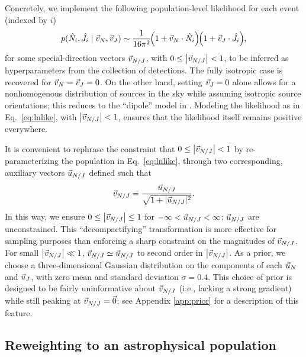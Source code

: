 \documentclass[aps,prd,twocolumn,superscriptaddress,preprintnumbers,floatfix,nofootinbib]{revtex4-2}
\begin{document}
Concretely, we implement the following population-level likelihood for each event (indexed by $i$)
\begin{equation}
\label{eq:lnlike}
p(\hat{N}_i,\hat{J}_i \mid \vec{v}_{N}, \vec{v}_{J}) \sim \frac{1}{16 \pi^2}  \hspace{-3pt}\left(1 + \vec{v}_{N} \cdot \hat{N}_i\right) \hspace{-3pt} \left(1 + \vec{v}_{J} \cdot \hat{J}_i\right) \hspace{-2pt} ,
\end{equation}
for some special-direction vectors $\vec{v}_{N/J}$, with $0 \leq \left| \vec{v}_{N/J} \right| < 1$, to be inferred as hyperparameters from the collection of detections.
The fully isotropic case is recovered for $\vec{v}_{N} = \vec{v}_{J} = 0$.
On the other hand, setting $\vec{v}_{J} = 0$ alone allows for a nonhomogenous distribution of sources in the sky while assuming isotropic source orientations; this reduces to the ``dipole'' model in \cite{Essick:2022slj}.
Modeling the likelihood as in Eq.~\eqref{eq:lnlike}, with $\left| \vec{v}_{N/J} \right| < 1$, ensures that the likelihood itself remains positive everywhere.

It is convenient to rephrase the constraint that $0 \leq \left| \vec{v}_{N/J} \right| <
1$ by re-parameterizing the population in Eq.~\eqref{eq:lnlike}, through two
corresponding, auxiliary vectors $\vec{u}_{N/J}$ defined such that
\begin{equation}
\vec{v}_{N/J} = \frac{\vec{u}_{N/J} }{\sqrt{1 + |\vec{u}_{N/J}|^2}} .
\end{equation}
In this way, we ensure $0 \leq \left| \vec{v}_{N/J} \right| \leq 1$ for $-\infty <
\vec{u}_{N/J} < \infty$; $\vec{u}_{N/J}$ are unconstrained.  This ``decompactifying'' transformation
is more effective for sampling purposes than enforcing a sharp constraint on the
magnitudes of $\vec{v}_{N/J}$. For small $\left| \vec{v}_{N/J} \right| \ll 1$, $\vec{v}_{N/J}
\simeq \vec{u}_{N/J}$ to second order in $\left| \vec{v}_{N/J} \right|$. As a prior, we choose a three-dimensional Gaussian distribution on the components of
each $\vec{u}_{N}$ and $\vec{u}_{J}$, with zero mean and standard deviation
$\sigma = 0.4$. This choice of prior is designed to be fairly uninformative about
$\vec{v}_{N/J}$ (i.e., lacking a strong gradient) while still peaking at $\vec{v}_{N/J} = \vec{0}$; see Appendix
\ref{app:prior} for a description of this feature.

\subsection{Reweighting to an astrophysical population}
\label{sec:reweight}
\end{document}
